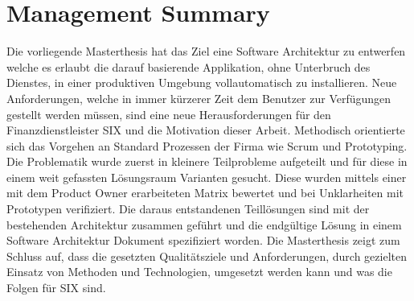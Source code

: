 \chapter{Management Summary}

Die vorliegende Masterthesis hat das Ziel eine Software Architektur zu entwerfen welche es erlaubt die darauf basierende Applikation, ohne Unterbruch des Dienstes, in einer produktiven Umgebung vollautomatisch zu installieren.\newline\newline
Neue Anforderungen, welche in immer kürzerer Zeit dem Benutzer zur Verfügungen gestellt werden müssen, sind eine neue Herausforderungen für den Finanzdienstleister SIX und die Motivation dieser Arbeit.\newline\newline
Methodisch orientierte sich das Vorgehen an Standard Prozessen der Firma wie Scrum und Prototyping. Die Problematik wurde zuerst in kleinere Teilprobleme aufgeteilt und für diese in einem weit gefassten Lösungsraum Varianten gesucht. Diese wurden mittels einer mit dem Product Owner erarbeiteten Matrix bewertet und bei Unklarheiten mit Prototypen verifiziert. Die daraus entstandenen Teillösungen sind mit der bestehenden Architektur zusammen geführt und die endgültige Lösung in einem Software Architektur Dokument spezifiziert worden.\newline\newline
Die Masterthesis zeigt zum Schluss auf, dass die gesetzten Qualitätsziele und Anforderungen, durch gezielten Einsatz von Methoden und Technologien, umgesetzt werden kann und was die Folgen für SIX sind.